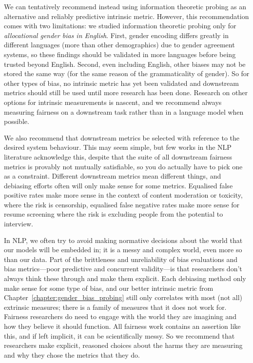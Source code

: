 We can tentatively recommend instead using information theoretic probing as an alternative and reliably predictive intrinsic metric. However, this recommendation comes with two limitations: we studied information theoretic probing only for \textit{allocational gender bias in English}. First, gender encoding differs greatly in different languages (more than other demographics) due to gender agreement systems, so these findings should be validated in more languages before being trusted beyond English. Second, even including English, other biases may not be stored the same way (for the same reason of the grammaticality of gender). So for other types of bias, no intrinsic metric has yet been validated and downstream metrics should still be used until more research has been done. Research on other options for intrinsic measurements is nascent, and we recommend always measuring fairness on a downstream task rather than in a language model when possible.

We also recommend that downstream metrics be selected with reference to the desired system behaviour. This may seem simple, but few works in the NLP literature acknowledge this, despite that the suite of all downstream fairness metrics is provably not mutually satisfiable, so you do actually have to pick one as a constraint. Different downstream metrics mean different things, and debiasing efforts often will only make sense for some metrics. Equalised false positive rates make more sense in the context of content moderation or toxicity, where the risk is censorship, equalised false negative rates make more sense for resume screening where the risk is excluding people from the potential to interview. 

In NLP, we often try to avoid making normative decisions about the world that our models will be embedded in; it is a messy and complex world, even more so than our data. Part of the brittleness and unreliability of bias evaluations and bias metrics---poor predictive and concurrent validity---is that researchers don't always think these through and make them explicit. Each debiasing method only make sense for some type of bias, and our better intrinsic metric from Chapter~\ref{chapter:gender_bias_probing} still only correlates with most (not all) extrinsic measures; there is a family of measures that it does not work for. Fairness researchers do need to engage with the world they are imagining and how they believe it should function. All fairness work contains an assertion like this, and if left implicit, it can be scientifically messy. So we recommend that researchers make explicit, reasoned choices about the harms they are measuring and why they chose the metrics that they do. 

